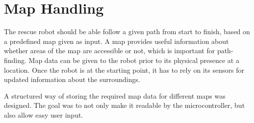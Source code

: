 
% 





\chapter{Map Handling}
\label{ch:map} %
The rescue robot should be able follow a given path from start to finish, based on a predefined map given as input.
A map provides useful information about whether areas of the map are accessible or not, which is important for path-finding.
Map data can be given to the robot prior to its physical presence at a location. Once the robot is at the starting point, it has to rely on its sensors for updated information about the surroundings.

A structured way of storing the required map data for different maps was designed. 
The goal was to not only make it readable by the microcontroller,
but also allow easy user input.


